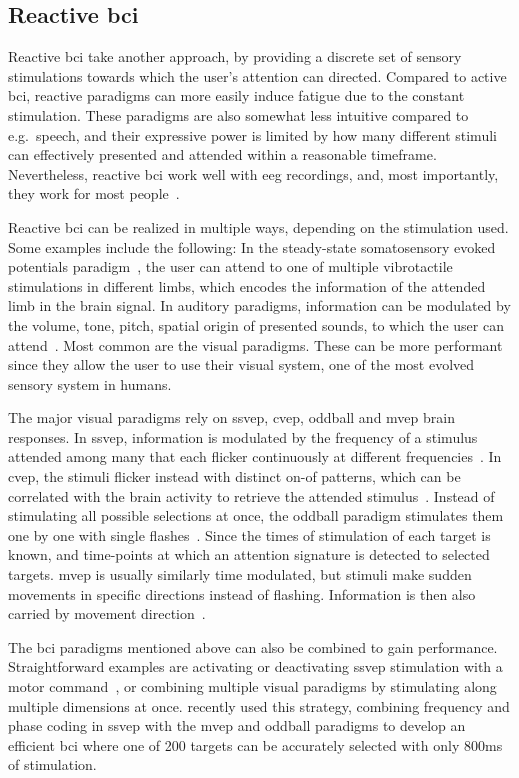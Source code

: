 \subsection{Reactive \ac{bci}}
Reactive \ac{bci} take another approach, by providing a discrete set of
sensory stimulations towards which the user's attention can directed.
Compared to active \ac{bci}, reactive paradigms can more easily induce fatigue
due to the constant stimulation.
These paradigms are also somewhat less intuitive compared to e.g.\ speech, and
their expressive power is limited by how many different stimuli can effectively
presented and attended within a reasonable timeframe.
Nevertheless, reactive \ac{bci} work well with \ac{eeg} recordings, and, most
importantly, they work for most people~\cite{Allison2010a,Edlinger2014}.

Reactive \ac{bci} can be realized in multiple ways, depending on the
stimulation used.
Some examples include the following:
In the steady-state somatosensory evoked potentials paradigm~\cite{Petit2021},
the user can attend to one of multiple vibrotactile stimulations in different
limbs, which encodes the information of the attended limb in the brain signal.
In auditory paradigms, information can be modulated by the volume, tone, pitch,
spatial origin of presented sounds, to which the user can
attend~\cite{Kaongoen2017}.
Most common are the visual paradigms.
These can be more performant since they allow the user to use their visual
system, one of the most evolved sensory system in humans.

The major visual paradigms rely on
\ac{ssvep}, \ac{cvep}, oddball and \ac{mvep} brain responses.
In \ac{ssvep}, information is modulated by the frequency of a stimulus attended
among many that each flicker continuously at different
frequencies~\cite{Chen2021}.
In \ac{cvep}, the stimuli flicker instead with distinct on-of patterns, which can
be correlated with the brain activity to retrieve the attended
stimulus~\cite{Sun2022}.
Instead of stimulating all possible selections at once, the oddball paradigm
stimulates them one by one with single flashes~\cite{Pan2022}.
Since the times of stimulation of each target is known, and time-points at
which an attention signature is detected to selected targets.
\Ac{mvep} is usually similarly time modulated, but stimuli make sudden
movements in specific directions instead of flashing.
Information is then also carried by movement
direction~\cite{Libert2021a,Libert2022}.

The \ac{bci} paradigms mentioned above can also be combined to gain performance.
Straightforward examples are activating or deactivating \ac{ssvep} stimulation
with a motor command~\cite{Neeling2019}, or combining multiple visual paradigms by stimulating
along multiple dimensions at once.
\textcite{Han2023} recently used this strategy, combining frequency and phase
coding in \ac{ssvep} with the \ac{mvep} and oddball paradigms to develop an
efficient \ac{bci} where one of 200 targets can be accurately selected with
only 800ms of stimulation.

